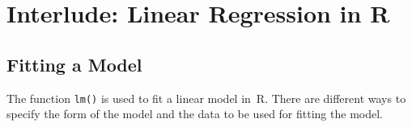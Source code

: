 \documentclass[
  a4paper,
]{article}
\theoremstyle{definition}
\theoremstyle{definition}
\theoremstyle{definition}
\theoremstyle{definition}
\theoremstyle{remark}
\begin{document}
\clearpage

\hypertarget{I01-lm}{%
\section*{Interlude: Linear Regression in R}\label{I01-lm}}

\hypertarget{lm-fitting}{%
\subsection*{Fitting a Model}\label{lm-fitting}}

The function \texttt{lm()} is used to fit a linear model in~R. There are different
ways to specify the form of the model and the data to be used for fitting the
model.
\end{document}
